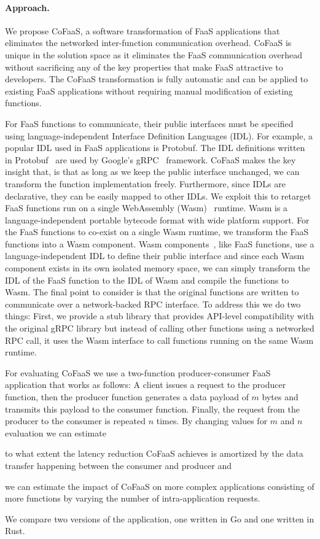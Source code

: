 \documentclass[../main.tex]{subfiles}
\begin{document}
\begin{refsection}
\paragraph{Approach.}
We propose CoFaaS, a software transformation of FaaS applications that
eliminates the networked inter-function communication overhead. CoFaaS
is unique in the solution space as it eliminates the FaaS
communication overhead without sacrificing any of the key properties
that make FaaS attractive to developers. The CoFaaS transformation is
fully automatic and can be applied to existing FaaS applications
without requiring manual modification of existing functions.


For FaaS functions to communicate, their public interfaces must be
specified using language-independent Interface Definition Languages
(IDL). For example, a popular IDL used in FaaS applications is
Protobuf. The IDL definitions written in Protobuf~\cite{protobuf} are
used by Google's gRPC~\cite{grpc} framework. CoFaaS makes the key
insight that, is that as long as we keep the public interface
unchanged, we can transform the function implementation
freely. Furthermore, since IDLs are declarative, they can be easily
mapped to other IDLs. We exploit this to retarget FaaS functions run
on a single WebAssembly (Wasm)~\cite{rossberg22_webas_core_specif}
runtime. Wasm is a language-independent portable bytecode format with
wide platform support. For the FaaS functions to co-exist on a single
Wasm runtime, we transform the FaaS functions into a Wasm
component. Wasm components~\cite{compmodel}, like FaaS functions, use
a language-independent IDL to define their public interface and since
each Wasm component exists in its own isolated memory space, we can
simply transform the IDL of the FaaS function to the IDL of Wasm and
compile the functions to Wasm. The final point to consider is that the
original functions are written to communicate over a network-backed
RPC interface. To address this we do two things: First, we provide a
stub library that provides API-level compatibility with the original
gRPC library but instead of calling other functions using a networked
RPC call, it uses the Wasm interface to call functions running on the
same Wasm runtime.

For evaluating CoFaaS we use a two-function producer-consumer FaaS
application that works as follows: A client issues a request to the
producer function, then the producer function generates a data payload
of $m$ bytes and transmits this payload to the consumer
function. Finally, the request from the producer to the consumer is
repeated $n$ times. By changing values for $m$ and $n$ evaluation we
can estimate \begin{inparaenum}[a)]
\item to what extent the latency reduction CoFaaS achieves is
  amortized by the data transfer happening between the consumer and
  producer and \item we can estimate the impact of CoFaaS on more
  complex applications consisting of more functions by varying the
  number of intra-application requests.
\end{inparaenum} We compare two versions of the application, one written in Go and one written in Rust.



\end{refsection}
\end{document}

